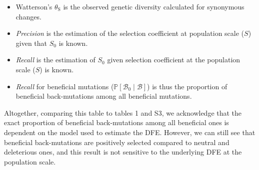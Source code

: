 \documentclass[12pt]{article}
\newcommand{\proba}{\mathbb{P}}
\newcommand{\Sphy}{S_{0}}
\newcommand{\SphyBen}{\mathcal{B}_0}
\newcommand{\given}{\mid}
\newcommand{\Spop}{S}
\newcommand{\SpopBen}{\mathcal{B}}
\newcommand{\thetaSyn}{\theta_{\text{S}}}
\begin{document}
    \begin{itemize}
        \item Watterson's $\thetaSyn$ is the observed genetic diversity calculated for synonymous changes.
        \item \textit{Precision} is the estimation of the selection coefficient at population scale ($\Spop$) given that $\Sphy$ is known.
        \item \textit{Recall} is the estimation of $\Sphy$ given selection coefficient at the population scale ($\Spop$) is known.
        \item \textit{Recall} for beneficial mutations ($\proba [\SphyBen \given \SpopBen]$) is thus the proportion of beneficial back-mutations among all beneficial mutations.
    \end{itemize}

    Altogether, comparing this table to tables 1 and S3, we acknowledge that the exact proportion of beneficial back-mutations among all beneficial ones is dependent on the model used to estimate the DFE.
    However, we can still see that beneficial back-mutations are positively selected compared to neutral and deleterious ones, and this result is not sensitive to the underlying DFE at the population scale.
    
    
    
\end{document}
